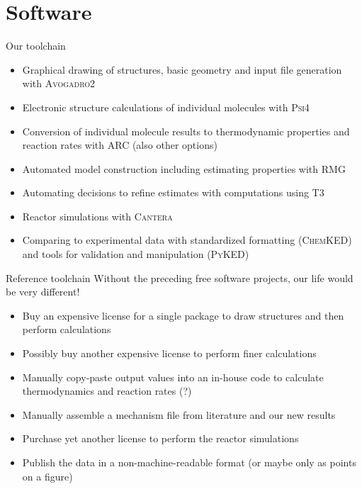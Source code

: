 \section{Software}

\begin{frame}{Our toolchain}
 \begin{itemize}
  \item Graphical drawing of structures, basic geometry and input file generation with \textsc{Avogadro2}
  \item Electronic structure calculations of individual molecules with \textsc{Psi4}
  \item Conversion of individual molecule results to thermodynamic properties and reaction rates with \textsc{ARC} (also other options)%
  \item Automated model construction including estimating properties with \textsc{RMG}
  \item Automating decisions to refine estimates with computations using \textsc{T3}
  \item Reactor simulations with \textsc{Cantera}
  \item Comparing to experimental data with standardized formatting (\textsc{ChemKED}) and tools for validation and manipulation (\textsc{PyKED})
 \end{itemize}
\end{frame}

\begin{frame}{Reference toolchain}
Without the preceding free software projects, our life would be very different!
 \begin{itemize}
  \item Buy an expensive license for a single package to draw structures and then perform calculations
  \item Possibly buy another expensive license to perform finer calculations
  \item Manually copy-paste output values into an in-house code to calculate thermodynamics and reaction rates (?)
  \item Manually assemble a mechanism file from literature and our new results
  \item Purchase yet another license to perform the reactor simulations
  \item Publish the data in a non-machine-readable format (or maybe only as points on a figure)
 \end{itemize}

 
\end{frame}

